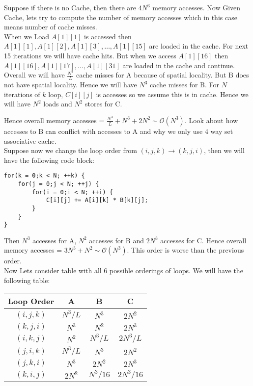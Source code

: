 \documentclass{article}
\begin{document}
Suppose if there is no Cache, then there are $4N^3$ memory accesses. Now Given Cache, lets try to compute the number of memory accesses which in this case means number of cache misses. \\

When we Load $A[1][1]$ is accessed then $A[1][1], A[1][2], A[1][3], \ldots, A[1][15]$ are loaded in the cache. For next 15 iterations we will have cache hits. But when we access $A[1][16]$ then $A[1][16], A[1][17], \ldots, A[1][31]$ are loaded in the cache and continue. \\

Overall we will have $\frac{N^3}{L}$ cache misses for A because of spatial locality. But B does not have spatial locality. Hence we will have $N^3$ cache misses for B. For $N$ iterations of $k$ loop, $C[i][j]$ is accesses so we assume this is in cache. Hence we will have $N^2$ loads and $N^2$ stores for C.

Hence overall memory accesses = $\frac{N^3}{L} + N^3 + 2N^2 \sim \mathcal{O}(N^3)$. Look about how accesses to B can conflict with accesses to A and why we only use 4 way set associative cache. \\

Suppose now we change the loop order from $(i,j,k) \rightarrow (k,j,i)$, then we will have the following code block:
\begin{lstlisting}
for(k = 0;k < N; ++k) {
    for(j = 0;j < N; ++j) {
        for(i = 0;i < N; ++i) {
            C[i][j] += A[i][k] * B[k][j];
        }
    }
}

\end{lstlisting}
Then $N^3$ accesses for A, $N^2$ accesses for B and $2N^3$ accesses for C. Hence overall memory accesses = $3N^3 + N^2 \sim \mathcal{O}(N^3)$. This order is worse than the previous order. \\

Now Lets consider table with all 6 possible orderings of loops. We will have the following table:
\begin{center}
    \begin{tabular}{|c|c|c|c|}
        \hline
        Loop Order & A & B & C \\
        \hline
        $(i,j,k)$ & $N^3/L$ & $N^3$ & $2N^2$ \\
        $(k,j,i)$ & $N^3$ & $N^2$ & $2N^3$ \\
        $(i,k,j)$ & $N^2$ & $N^3/L$ & $2N^3/L$ \\
        $(j,i,k)$ & $N^3/L$ & $N^3$ & $2N^2$ \\
        $(j,k,i)$ & $N^3$ & $2N^2$ & $2N^3$ \\
        $(k,i,j)$ & $2N^2$ & $N^3/16$ & $2N^3/16$ \\
        \hline
    \end{tabular}
\end{center}
\end{document}

